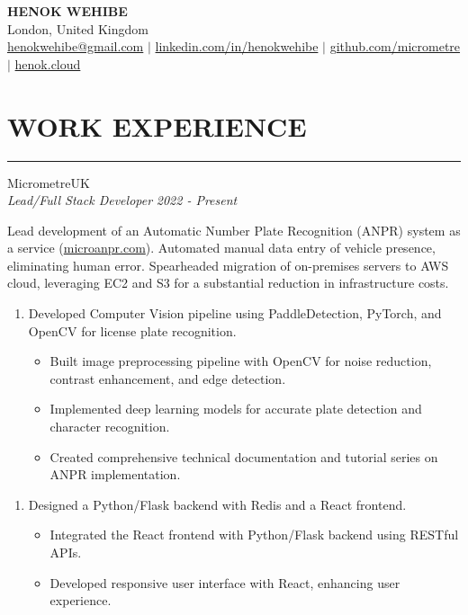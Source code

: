 \documentclass{article}
\begin{document}
\begin{center}
\textbf{\huge HENOK WEHIBE} \\
\vspace{1.0em}
London, United Kingdom \\
\vspace{0.5em}
\href{mailto:henokwehibe@gmail.com}{henokwehibe@gmail.com} $|$
\href{https://linkedin.com/in/henokwehibe}{linkedin.com/in/henokwehibe} $|$
\href{https://github.com/micrometre}{github.com/micrometre} $|$
\href{https://henok.cloud}{henok.cloud}\\
\end{center}
\vspace{-3.6em}
\section* {WORK EXPERIENCE}
\vspace{0.6em}
\hrule 
{\bf}{} MicrometreUK \hfill {} \\%
{\em Lead/Full Stack Developer} \hfill {\em 2022 - Present } %

Lead development of an Automatic Number Plate Recognition (ANPR) system as a service (\href{https://microanpr.com}{microanpr.com}). 
Automated manual data entry of vehicle presence, eliminating human error.
Spearheaded migration of on-premises servers to AWS cloud, leveraging EC2 and S3 for a substantial reduction in infrastructure costs.



\begin{enumerate}
    \item[] Developed Computer Vision pipeline using PaddleDetection, PyTorch, and OpenCV for license plate recognition.
   \begin{itemize}
    \item Built image preprocessing pipeline with OpenCV for noise reduction, contrast enhancement, and edge detection.
    \item Implemented deep learning models for accurate plate detection and character recognition.
    \item Created comprehensive technical documentation and tutorial series on ANPR implementation.
   \end{itemize}
\end{enumerate}


\begin{enumerate}
    \item[] Designed a Python/Flask backend with Redis and a React frontend. 
   \begin{itemize}
    \item Integrated the React frontend with Python/Flask backend using RESTful APIs.
    \item Developed responsive user interface with React, enhancing user experience.
   \end{itemize}
\end{enumerate}
\end{document}
